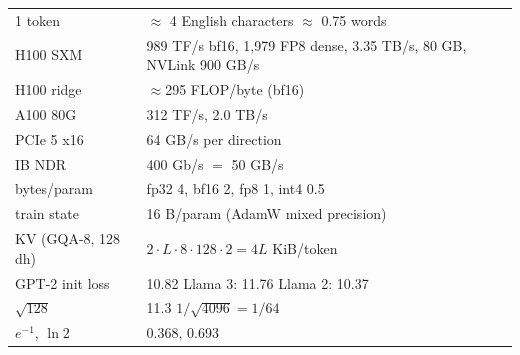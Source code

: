 \begin{mem}
\begin{tabularx}{\linewidth}{@{}lL@{}}
 token & $\approx$ 4 English characters $\approx$ 0.75 words\\
H100 SXM & 989 TF/s bf16, 1{,}979 FP8 dense, 3.35 TB/s, 80 GB, NVLink 900 GB/s\\
H100 ridge & $\approx$295 FLOP/byte (bf16)\\
A100 80G & 312 TF/s, 2.0 TB/s\\
PCIe 5 x16 & 64 GB/s per direction\\
IB NDR & 400 Gb/s $=$ 50 GB/s\\
bytes/param & fp32 4, bf16 2, fp8 1, int4 0.5\\
train state & 16 B/param (AdamW mixed precision)\\
KV (GQA-8, 128 dh) & $2\cdot L\cdot8\cdot128\cdot2=4L$ KiB/token\\
GPT-2 init loss & 10.82 \quad Llama 3: 11.76 \quad Llama 2: 10.37\\
$\sqrt{128}$ & 11.3 \quad $1/\sqrt{4096}=1/64$\\
$e^{-1}$, $\ln2$ & 0.368, 0.693\\\bottomrule
\end{tabularx}
\end{mem}
